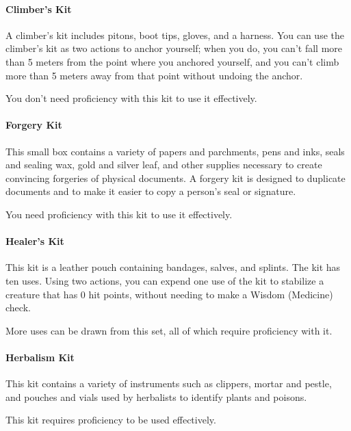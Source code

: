     \paragraph{Climber's Kit}
        A climber's kit includes pitons, boot tips, gloves, and a harness.
        You can use the climber's kit as two actions to anchor yourself; when you do, you can't fall more than 5 meters from the point where you anchored yourself, and you can't climb more than 5 meters away from that point without undoing the anchor.

        You don't need proficiency with this kit to use it effectively.
    \paragraph{Forgery Kit}
        This small box contains a variety of papers and parchments, pens and inks, seals and sealing wax, gold and silver leaf, and other supplies necessary to create convincing forgeries of physical documents.
        A forgery kit is designed to duplicate documents and to make it easier to copy a person's seal or signature.

        You need proficiency with this kit to use it effectively.
    \paragraph{Healer's Kit}
        This kit is a leather pouch containing bandages, salves, and splints.
        The kit has ten uses.
        Using two actions, you can expend one use of the kit to stabilize a creature that has 0 hit points, without needing to make a Wisdom (Medicine) check.

        More uses can be drawn from this set, all of which require proficiency with it.
    \paragraph{Herbalism Kit}
        This kit contains a variety of instruments such as clippers, mortar and pestle, and pouches and vials used by herbalists to identify plants and poisons.

        This kit requires proficiency to be used effectively.

